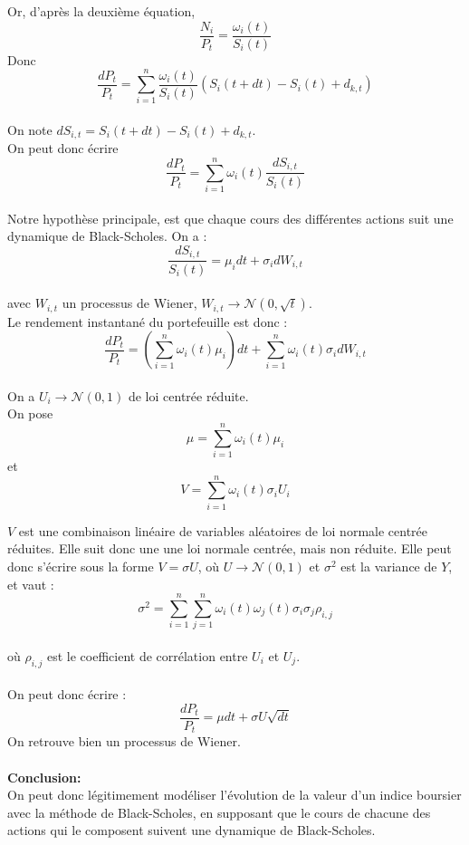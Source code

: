 \documentclass[french,12pt,a4paper]{article}
\begin{document}
Or, d'après la deuxième équation,
$$ \frac{N_i}{P_t} = \frac{\omega_i(t)}{S_i(t)} $$
Donc
$$ \frac{dP_t}{P_t} = \sum_{i=1}^n\frac{\omega_i(t)}{S_i(t)}(S_i(t+dt)-S_i(t) + d_{k,t}) $$
\\
On note $ dS_{i,t} = S_i(t+dt)-S_i(t)+d_{k,t} $. \\
On peut donc écrire
$$ \frac{dP_t}{P_t} = \sum_{i=1}^n\omega_i(t)\frac{dS_{i,t}}{S_i(t)} $$
\\
Notre hypothèse principale, est que chaque cours des différentes actions suit une dynamique de Black-Scholes. On a :
$$ \frac{dS_{i,t}}{S_i(t)} = \mu_idt + \sigma_i dW_{i,t} $$ \\
avec $W_{i,t}$ un processus de Wiener, $ W_{i,t} \rightarrow \mathcal{N}(0,\sqrt{t})$.\\

Le rendement instantané du portefeuille est donc :
$$ \frac{dP_t}{P_t} = (\sum_{i=1}^n\omega_i(t)\mu_i)dt + \sum_{i=1}^n\omega_i(t)\sigma_idW_{i,t} $$ \\
On a  $U_i \rightarrow \mathcal{N}(0,1)$ de loi centrée réduite. \\
On pose
$$\mu = \sum_{i=1}^n\omega_i(t)\mu_i$$ et $$V = \sum_{i=1}^n\omega_i(t)\sigma_iU_i$$

$V$ est une combinaison linéaire de variables aléatoires de loi normale centrée réduites. Elle suit donc une une loi normale centrée, mais non réduite. Elle peut donc s'écrire sous la forme $V = \sigma U$, où $U \rightarrow \mathcal{N}(0,1)$ et $\sigma^2$ est la variance de $Y$, et vaut :
$$\sigma^2 = \sum_{i=1}^n\sum_{j=1}^n\omega_i(t)\omega_j(t)\sigma_i\sigma_j\rho_{i,j} $$ \\
où $\rho_{i,j}$ est le coefficient de corrélation entre $U_i$ et $U_j$. \\\\
On peut donc écrire :
$$ \frac{dP_t}{P_t} = \mu dt + \sigma U \sqrt{dt} $$
On retrouve bien un processus de Wiener. \\ \\
\textbf{Conclusion:}\\
On peut donc légitimement modéliser l'évolution de la valeur d'un indice boursier avec la méthode de Black-Scholes, en supposant que le cours de chacune des actions qui le composent suivent une dynamique de Black-Scholes.
\end{document}
